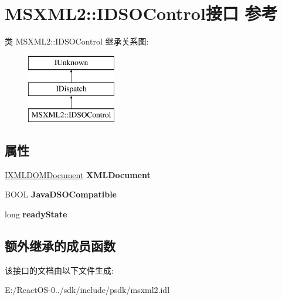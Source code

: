 \hypertarget{interface_m_s_x_m_l2_1_1_i_d_s_o_control}{}\section{M\+S\+X\+M\+L2\+:\+:I\+D\+S\+O\+Control接口 参考}
\label{interface_m_s_x_m_l2_1_1_i_d_s_o_control}
类 M\+S\+X\+M\+L2\+:\+:I\+D\+S\+O\+Control 继承关系图\+:\begin{figure}[H]
\begin{center}
\leavevmode
\includegraphics[height=3.000000cm]{interface_m_s_x_m_l2_1_1_i_d_s_o_control}
\end{center}
\end{figure}
\subsection*{属性}
\begin{DoxyCompactItemize}
\item 
\mbox{\label{interface_m_s_x_m_l2_1_1_i_d_s_o_control_a6897dd52b6a6dee85ad53d3c46b817f6}} 
\hyperlink{interface_m_s_x_m_l2_1_1_i_x_m_l_d_o_m_document}{I\+X\+M\+L\+D\+O\+M\+Document} {\bfseries X\+M\+L\+Document}
\item 
\mbox{\label{interface_m_s_x_m_l2_1_1_i_d_s_o_control_a5b40609e4282a582e8ab799b5c8a10e0}} 
B\+O\+OL {\bfseries Java\+D\+S\+O\+Compatible}
\item 
\mbox{\label{interface_m_s_x_m_l2_1_1_i_d_s_o_control_a41d9f57fa216921a6d709e600ef2172b}} 
long {\bfseries ready\+State}
\end{DoxyCompactItemize}
\subsection*{额外继承的成员函数}


该接口的文档由以下文件生成\+:\begin{DoxyCompactItemize}
\item 
E\+:/\+React\+O\+S-\/0../sdk/include/psdk/msxml2.\+idl\end{DoxyCompactItemize}

